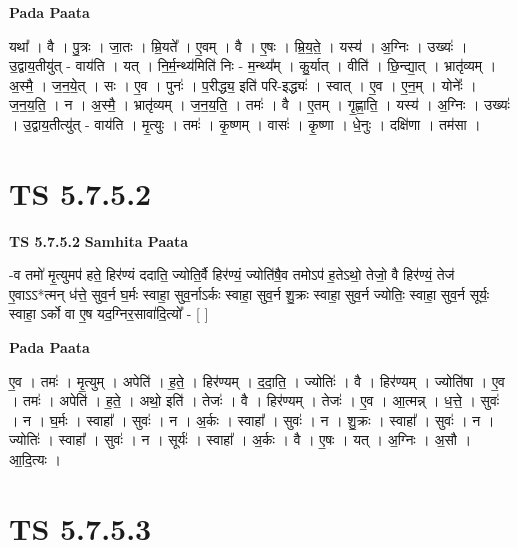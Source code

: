\documentclass[17pt]{extarticle}
\begin{document}
\textbf{Pada Paata} \newline

यथा᳚ । वै । पु॒त्रः । जा॒तः । म्रि॒यते᳚ । ए॒वम् । वै । ए॒षः । म्रि॒य॒ते॒ । यस्य॑ । अ॒ग्निः । उख्यः॑ । उ॒द्वाय॒तीयु॑त् - वाय॑ति । यत् । नि॒र्म॒न्थ्य॑मिति॑ निः - म॒न्थ्य᳚म् । कु॒र्यात् । वीति॑ । छि॒न्द्या॒त् । भ्रातृ॑व्यम् । अ॒स्मै॒ । ज॒न॒ये॒त् । सः । ए॒व । पुनः॑ । प॒रीद्ध्य॒ इति॑ परि-इद्ध्यः॑ । स्वात् । ए॒व । ए॒न॒म् । योनेः᳚ । ज॒न॒य॒ति॒ । न । अ॒स्मै॒ । भ्रातृ॑व्यम् । ज॒न॒य॒ति॒ । तमः॑ । वै । ए॒तम् । गृ॒ह्णा॒ति॒ । यस्य॑ । अ॒ग्निः । उख्यः॑ । उ॒द्वाय॒तीत्यु॑त् - वाय॑ति । मृ॒त्युः । तमः॑ । कृ॒ष्णम् । वासः॑ । कृ॒ष्णा । धे॒नुः । दक्षि॑णा । तम॑सा ।  \newline





\section{ TS 5.7.5.2 }

\textbf{TS 5.7.5.2 } \newline
\textbf{Samhita Paata} \newline

-व तमो॑ मृ॒त्युमप॑ हते॒ हिर॑ण्यं ददाति॒ ज्योति॒र्वै हिर॑ण्यं॒ ज्योति॑षै॒व तमोऽप॑ ह॒तेऽथो॒ तेजो॒ वै हिर॑ण्यं॒ तेज॑ ए॒वाऽऽ*त्मन् ध॑त्ते॒ सुव॒र्न घ॒र्मः स्वाहा॒ सुव॒र्नाऽर्कः स्वाहा॒ सुव॒र्न शु॒क्रः स्वाहा॒ सुव॒र्न ज्योतिः॒ स्वाहा॒ सुव॒र्न सूर्यः॒ स्वाहा॒ ऽर्को वा ए॒ष यद॒ग्निर॒सावा॑दि॒त्यो᳚ - [  ] \newline

\textbf{Pada Paata} \newline

ए॒व । तमः॑ । मृ॒त्युम् । अपेति॑ । ह॒ते॒ । हिर॑ण्यम् । द॒दा॒ति॒ । ज्योतिः॑ । वै । हिर॑ण्यम् । ज्योति॑षा । ए॒व । तमः॑ । अपेति॑ । ह॒ते॒ । अथो॒ इति॑ । तेजः॑ । वै । हिर॑ण्यम् । तेजः॑ । ए॒व । आ॒त्मन्न् । ध॒त्ते॒ । सुवः॑ । न । घ॒र्मः । स्वाहा᳚ । सुवः॑ । न । अ॒र्कः । स्वाहा᳚ । सुवः॑ । न । शु॒क्रः । स्वाहा᳚ । सुवः॑ । न । ज्योतिः॑ । स्वाहा᳚ । सुवः॑ । न । सूर्यः॑ । स्वाहा᳚ । अ॒र्कः । वै । ए॒षः । यत् । अ॒ग्निः । अ॒सौ । आ॒दि॒त्यः ।  \newline





\section{ TS 5.7.5.3 }
\end{document}
